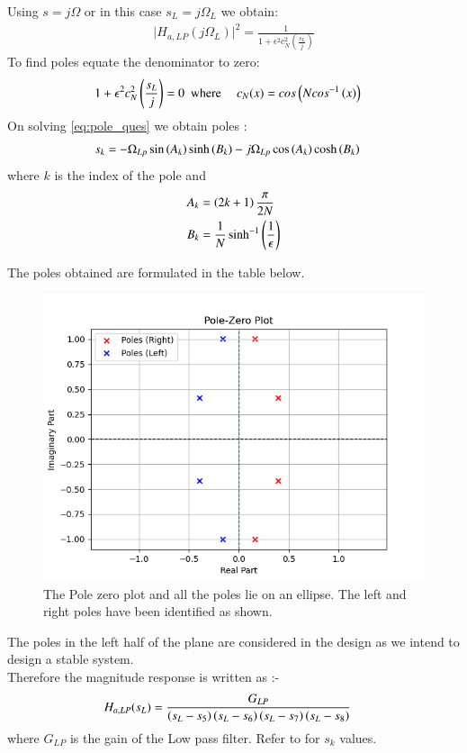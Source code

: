 \documentclass{article}
\begin{document}
\begin{enumerate}
Using $s=j\Omega$ or in this case $s_{L}=j\Omega_{L}$ we obtain:
\begin{align}
    \vert H_{a,LP}(j\Omega_L)\vert^2 = \frac{1}{1 + \epsilon^2c_N^2(\frac{s_L}{j})}
\end{align}
To find poles equate the denominator to zero:
\begin{align}
    {1 + \epsilon^2c_N^2\ensuremath{\left(\frac{s_L}{j}\right)}} &=0\hspace{5pt }
    \text{where } \hspace{10pt} c_N(x) = cos\left(Ncos^{-1}\left(x\right)\right) \label{eq:pole_ques}
\end{align}
On solving \eqref{eq:pole_ques} we obtain poles :
\begin{align}
    s_{k} &= -\Omega_{Lp} \sin\left(A_k\right)\sinh\left(B_k\right) - j\Omega_{Lp}\cos\left(A_k\right)\cosh\left(B_k\right)
\end{align}
where $k$ is the index of the pole and \\
\begin{align}
    A_k &= \left(2k+1\right)\frac{\pi}{2N}\\
    B_k &= \frac{1}{N} \sinh^{-1}\left(\frac{1}{\epsilon}\right)
\end{align}

The poles obtained are formulated in the table below.


\begin{figure}[H]
\centering
\includegraphics[width=1\columnwidth]{figs/Pole_Zero_plt.png}
\caption{The Pole zero plot and all the poles lie on an ellipse. The left and right poles have been identified as shown.}
\label{fig:pole_zero_plt}
\end{figure}
The poles in the left half of the plane are considered in the design as we intend to design a stable system.\\
Therefore the magnitude response is written as :- 
\begin{align}
    H_{a,LP}(s_L) &= \frac{G_{LP}}{\left(s_L-s_5\right)\left(s_L-s_6\right)\left(s_L-s_7\right)\left(s_L-s_8\right)}
\end{align}
where $G_{LP}$ is the gain of the Low pass filter. Refer to  for $s_k$ values.\\


\end{enumerate}
\end{document}
